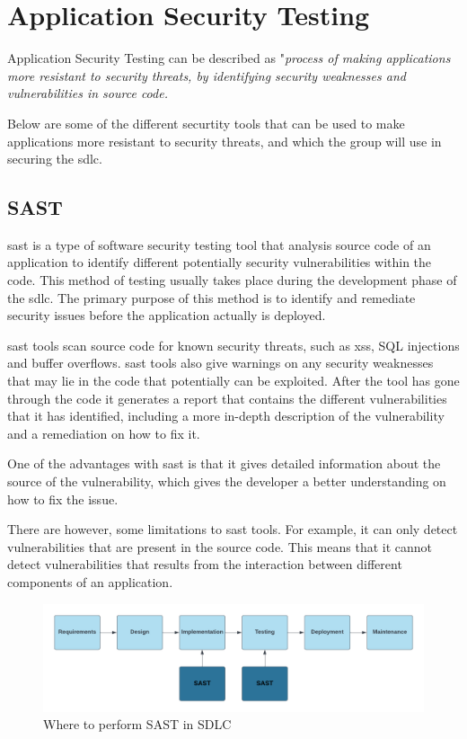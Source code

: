 \section{Application Security Testing}
Application Security Testing can be described as "\textit{process of making applications more resistant to security threats, by identifying security weaknesses and vulnerabilities in source code.}\cite{AST}

Below are some of the different securtity tools that can be used to make applications more resistant to security threats, and which the group will use in securing the \acrshort{sdlc}.

\subsection{SAST}
\acrlong{sast} is a type of software security testing tool that analysis source code of an application to identify different potentially security vulnerabilities within the code. This method of testing usually takes place during the development phase of the \acrlong{sdlc}. The primary purpose of this method is to identify and remediate security issues before the application actually is deployed. \cite{sast}

\acrshort{sast} tools scan source code for known security threats, such as \acrlong{xss}, SQL injections and buffer overflows. \acrshort{sast} tools also give warnings on any security weaknesses that may lie in the code that potentially can be exploited. After the tool has gone through the code it generates a report that contains the different vulnerabilities that it has identified, including a more in-depth description of the vulnerability and a remediation on how to fix it. 

One of the advantages with \acrshort{sast} is that it gives detailed information about the source of the vulnerability, which gives the developer a better understanding on how to fix the issue. 

There are however, some limitations to \acrshort{sast} tools. For example, it can only detect vulnerabilities that are present in the source code. This means that it cannot detect vulnerabilities that results from the interaction between different components of an application.
\begin{figure}[htp]
    \centering
    \includegraphics[width=1\columnwidth]{Images/SAST.png}
    \caption{Where to perform SAST in SDLC}
    \label{fig:my_label}
\end{figure}

